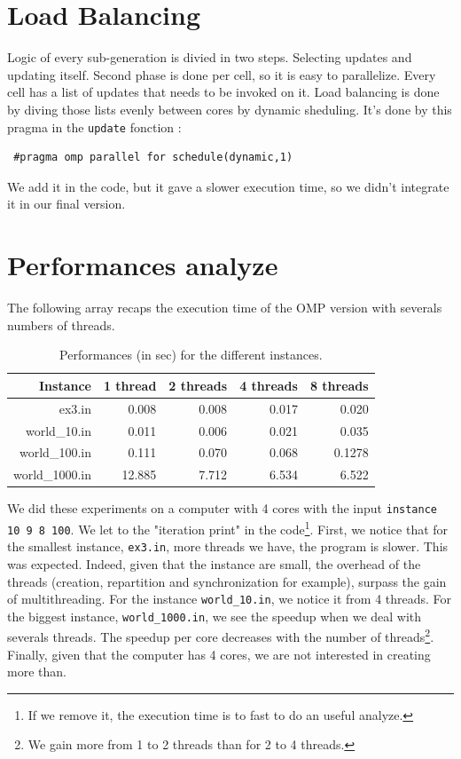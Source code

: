 \documentclass[a4paper,10pt]{article}
\begin{document}
\section*{Load Balancing}
Logic of every sub-generation is divied in two steps. 
Selecting updates and updating itself. 
Second phase is done per cell, so it is easy to parallelize. 
Every cell has a list of updates that needs to be invoked on it. 
Load balancing is done by diving those lists evenly between cores by dynamic sheduling. It's done by this pragma
in the \texttt{update} fonction :

\begin{lstlisting}
 #pragma omp parallel for schedule(dynamic,1)
\end{lstlisting}

We add it in the code, but it gave a slower execution time, so we didn't integrate it in our final version.

\section*{Performances analyze}

The following array recaps the execution time of the OMP version with severals numbers of threads.
\begin{table}[!ht]
\centering
\begin{tabular}{|r||r|r|r|r|}
  \hline
    Instance     & 1 thread   & 2 threads   & 4 threads  & 8 threads  \\
  \hline
    ex3.in       &  0.008     & 0.008        & 0.017       &  0.020 \\ 
  \hline
    world\_10.in &  0.011      &  0.006       & 0.021       & 0.035 \\ 
  \hline
   world\_100.in &  0.111      & 0.070        & 0.068      & 0.1278 \\ 
  \hline
  world\_1000.in &  12.885   & 7.712       & 6.534      &  6.522 \\ 
  \hline
\end{tabular}
\caption{Performances (in sec) for the different instances.}
\end{table}

We did these experiments on a computer with 4 cores with the input \texttt{instance 10 9 8 100}. We
let to the "iteration print" in the code\footnote{If we remove it, the execution time is to fast to do an useful analyze.}.
First, we notice that for the smallest instance, \texttt{ex3.in},
more threads we have, the program is slower. This was expected. Indeed, given that the instance are small, the overhead of the threads (creation, repartition and
synchronization for example), surpass the gain of multithreading.
For the instance \texttt{world\_10.in}, we notice it from 4 threads.
For the biggest instance, \texttt{world\_1000.in}, we see the speedup when we deal with severals threads. The speedup per core decreases with the number
of threads\footnote{We gain more from 1 to 2 threads than for 2 to 4 threads.}.
Finally, given that the computer has 4 cores, we are not interested in creating more than.
\\
\end{document}
